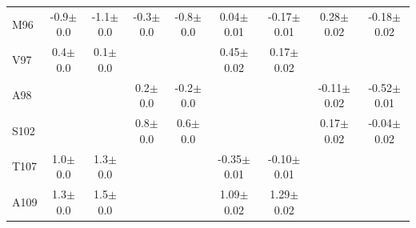 \documentclass[%
 aip,
 amsmath,amssymb,
 preprint,%
]{revtex4-1}
\begin{document}
\begin{center}
\begin{longtable}{l|c|c|c|c|c|c|c|c}
M96 & -0.9$\pm$0.0 & -1.1$\pm$0.0 & -0.3$\pm$0.0 & -0.8$\pm$0.0 & 0.04$\pm$0.01 & -0.17$\pm$0.01 & 0.28$\pm$0.02 & -0.18$\pm$0.02 \\
V97 & 0.4$\pm$0.0 & 0.1$\pm$0.0 & & & 0.45$\pm$0.02 & 0.17$\pm$0.02 & & \\
A98 & & & 0.2$\pm$0.0 & -0.2$\pm$0.0 & & & -0.11$\pm$0.02 & -0.52$\pm$0.01 \\
S102 & & & 0.8$\pm$0.0 & 0.6$\pm$0.0 & & & 0.17$\pm$0.02 & -0.04$\pm$0.02 \\
T107 & 1.0$\pm$0.0 & 1.3$\pm$0.0 & & & -0.35$\pm$0.01 & -0.10$\pm$0.01 & & \\
A109 & 1.3$\pm$0.0 & 1.5$\pm$0.0 & & & 1.09$\pm$0.02 & 1.29$\pm$0.02 & & \\
\end{longtable}
\end{center}
\endgroup
\end{document}
